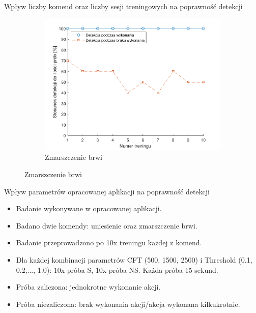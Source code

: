 \documentclass[10pt,aspectratio=169]{beamer}
\begin{document}
\begin{frame}{Wpływ liczby komend oraz liczby sesji treningowych na poprawność detekcji}
\begin{figure}[htb]
\begin{subfigure}{0.3\linewidth}
    \includegraphics[width=\linewidth,keepaspectratio]{obrazy/frown}
    \caption{Zmarszczenie brwi}
    \end{subfigure}\hspace*{\fill}
  \end{figure}
\end{frame}
\begin{frame}{Wpływ parametrów opracowanej aplikacji na poprawność detekcji}
  \begin{itemize}
    \item Badanie wykonywane w opracowanej aplikacji.
    \item Badano dwie komendy: uniesienie oraz zmarszczenie brwi.
    \item Badanie przeprowadzono po 10x treningu każdej z komend.
    \item Dla każdej kombinacji parametrów CFT (500, 1500, 2500) i Threshold (0.1, 0.2,..., 1.0): 10x próba S, 10x próba NS. Każda próba 15 sekund.
    \item Próba zaliczona: jednokrotne wykonanie akcji.
    \item Próba niezaliczona: brak wykonania akcji/akcja wykonana kilkukrotnie.
  \end{itemize}
\end{frame}
\end{document}
